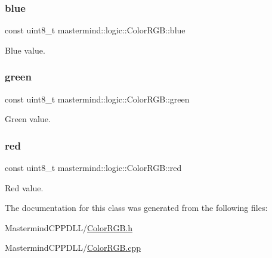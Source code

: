 \subsubsection{\texorpdfstring{blue}{blue}}
{\footnotesize\ttfamily const uint8\+\_\+t mastermind\+::logic\+::\+Color\+R\+G\+B\+::blue\hspace{0.3cm}{\ttfamily [private]}}



Blue value. 

\hypertarget{classmastermind_1_1logic_1_1_color_r_g_b_abcdd46578394ad832e79ccf2affdd51e}{}\label{classmastermind_1_1logic_1_1_color_r_g_b_abcdd46578394ad832e79ccf2affdd51e} 
\subsubsection{\texorpdfstring{green}{green}}
{\footnotesize\ttfamily const uint8\+\_\+t mastermind\+::logic\+::\+Color\+R\+G\+B\+::green\hspace{0.3cm}{\ttfamily [private]}}



Green value. 

\hypertarget{classmastermind_1_1logic_1_1_color_r_g_b_a8f9661c51195e67f2c22009805e6b3d2}{}\label{classmastermind_1_1logic_1_1_color_r_g_b_a8f9661c51195e67f2c22009805e6b3d2} 
\subsubsection{\texorpdfstring{red}{red}}
{\footnotesize\ttfamily const uint8\+\_\+t mastermind\+::logic\+::\+Color\+R\+G\+B\+::red\hspace{0.3cm}{\ttfamily [private]}}



Red value. 



The documentation for this class was generated from the following files\+:\begin{DoxyCompactItemize}
\item 
Mastermind\+C\+P\+P\+D\+L\+L/\hyperlink{_color_r_g_b_8h}{Color\+R\+G\+B.\+h}\item 
Mastermind\+C\+P\+P\+D\+L\+L/\hyperlink{_color_r_g_b_8cpp}{Color\+R\+G\+B.\+cpp}\end{DoxyCompactItemize}
